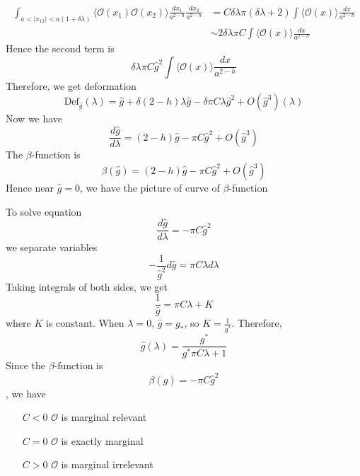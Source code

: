 \begin{equation}
	\begin{split}
	\int_{a < |x_{12} | < a(1+\delta\lambda)} \langle \mathcal{O}(x_1) \mathcal{O}(x_2) \rangle \frac{d x_1}{a^{2-h}} \frac{d x_2}{a^{2-h}} & = C \delta \lambda \pi (\delta\lambda +2) \int \langle \mathcal{O}(x)\rangle \frac{dx}{a^{2-h}}\\
	& \sim 2 \delta \lambda \pi C \int \langle \mathcal{O}(x) \rangle \frac{dx}{a^{2-h}}
	\end{split}
\end{equation}
Hence the second term is 
\[
\delta \lambda \pi C \hat{g}^2  \int \langle \mathcal{O}(x) \rangle \frac{dx}{a^{2-h}}
\]
Therefore, we get deformation
\begin{equation}
	\text{Def}_{\hat{g}}(\lambda) = \hat{g} + \delta(2-h) \lambda \hat{g} - \delta \pi C \lambda \hat{g}^2 + O(\hat{g}^3)(\lambda)
\end{equation}
Now we have 
\begin{equation}
	\frac{d \hat{g}}{d\lambda} = (2-h) \hat{g} - \pi C \hat{g}^2 + O(\hat{g}^3)
\end{equation}
The $\beta$-function is 
\[
\beta(\hat{g}) = (2-h) \hat{g} - \pi C \hat{g}^2 + O(\hat{g}^3)
\]
Hence near $\hat{g}=0$, we have the picture of curve of $\beta$-function

To solve equation
\begin{equation}
	\frac{d\hat{g}}{d\lambda} = - \pi C \hat{g}^2
\end{equation}
we separate variables
\[
- \frac{1}{\hat{g}^2} d \hat{g} = \pi C \lambda d\lambda
\]
Taking integrals of both sides, we get
\begin{equation}
\frac{1}{\hat{g}} = \pi C\lambda +K
\end{equation}
where $K$ is constant. When $\lambda=0$, $\hat{g} = g_*$, so $K = \frac{1}{g^*}$. Therefore,
\[
\hat{g}(\lambda) = \frac{g^*}{g^* \pi C \lambda +1}
\]
Since the $\beta$-function is
\[ 
\beta(\hat{g}) = - \pi C \hat{g}^2
\]
, we have
\begin{itemize}
	\item[$C < 0$] $\mathcal{O}$ is marginal relevant
	\item[$C=0$] $\mathcal{O}$ is exactly marginal
	\item[$C > 0$] $\mathcal{O}$ is marginal irrelevant
\end{itemize}